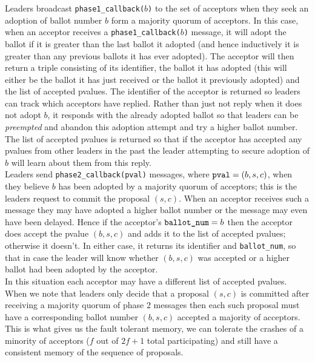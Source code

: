 Leaders broadcast \texttt{phase1\_callback($b$)} to the set of acceptors when they seek an adoption of ballot number $b$ form a majority quorum of acceptors. In this case, when an acceptor receives a \texttt{phase1\_callback($b$)} message, it will adopt the ballot if it is greater than the last ballot it adopted (and hence inductively it is greater than any previous ballots it has ever adopted). The acceptor will then return a triple consisting of its identifier, the ballot it has adopted (this will either be the ballot it has just received or the ballot it previously adopted) and the list of accepted pvalues. The identifier of the acceptor is returned so leaders can track which acceptors have replied. Rather than just not reply when it does not adopt $b$, it responds with the already adopted ballot so that leaders can be \emph{preempted} and abandon this adoption attempt and try a higher ballot number. The list of accepted pvalues is returned so that if the acceptor has accepted any pvalues from other leaders in the past the leader attempting to secure adoption of $b$ will learn about them from this reply. \\

Leaders send \texttt{phase2\_callback(pval)} messages, where $\textrm{\texttt{pval}} = \left( b, s, c \right)$, when they believe $b$ has been adopted by a majority quorum of acceptors; this is the leaders request to commit the proposal $(s,c)$. When an acceptor receives such a message they may have adopted a higher ballot number or the message may even have been delayed. Hence if the acceptor's $\textrm{\texttt{ballot\_num}} = b$ then the acceptor does accept the pvalue $(b,s,c)$ and adds it to the list of accepted pvalues; otherwise it doesn't. In either case, it returns its identifier and \texttt{ballot\_num}, so that in case the leader will know whether $(b,s,c)$ was accepted or a higher ballot had been adopted by the acceptor. \\

In this situation each acceptor may have a different list of accepted pvalues. When we note that leaders only decide that a proposal $(s,c)$ is committed after receiving a majority quorum of phase 2 messages then each such proposal must have a corresponding ballot number $(b,s,c)$ accepted a majority of acceptors. This is what gives us the fault tolerant memory, we can tolerate the crashes of a minority of acceptors ($f$ out of $2f+1$ total participating) and still have a consistent memory of the sequence of proposals.

